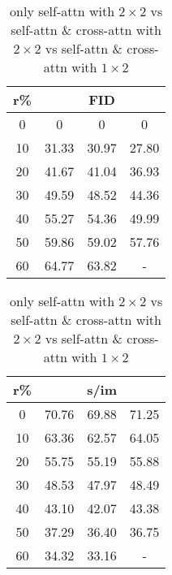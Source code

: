 \begin{table}[htp]
\caption{only self-attn with $2 \times 2$ vs self-attn \& cross-attn with $2 \times 2$ vs self-attn \& cross-attn with $1 \times 2$}
    \begin{minipage}{0.48\textwidth}
        \centering
        \begin{tabular}{|c||c|c|c|}
            \hline
            \multicolumn{1}{|c||}{r\%} & \multicolumn{3}{c|}{FID}\\
            \hline
            0 & 0 & 0 & 0 \\
            10 & 31.33 & 30.97 & 27.80 \\
            20 & 41.67 & 41.04 & 36.93 \\
            30 & 49.59 & 48.52 & 44.36 \\
            40 & 55.27 & 54.36 & 49.99 \\
            50 & 59.86 & 59.02 & 57.76 \\
            60 & 64.77 & 63.82 & - \\
            \hline
        \end{tabular}
    \end{minipage}
    \hfill
    \begin{minipage}{0.48\textwidth}
        \centering
        \begin{tabular}{|c||c|c|c|}
            \hline
            \multicolumn{1}{|c||}{r\%} & \multicolumn{3}{c|}{s/im}\\
            \hline
            0 & 70.76 & 69.88 & 71.25 \\
            10 & 63.36 & 62.57 & 64.05 \\
            20 & 55.75 & 55.19 & 55.88 \\
            30 & 48.53 & 47.97 & 48.49 \\
            40 & 43.10 & 42.07 & 43.38 \\
            50 & 37.29 & 36.40 & 36.75 \\
            60 & 34.32 & 33.16 & - \\
            \hline
        \end{tabular}
    \end{minipage}
\end{table}